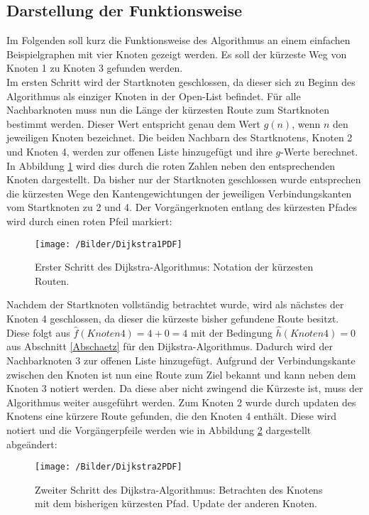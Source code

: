 	\subsection{Darstellung der Funktionsweise}
		Im Folgenden soll kurz die Funktionsweise des Algorithmus an einem einfachen Beispielgraphen mit vier Knoten gezeigt werden. Es soll der kürzeste Weg von Knoten 1 zu Knoten 3 gefunden werden.\\[4pt]
		Im ersten Schritt wird der Startknoten geschlossen, da dieser sich zu Beginn des Algorithmus als einziger Knoten in der Open-List befindet. Für alle Nachbarknoten muss nun die Länge der kürzesten Route zum Startknoten bestimmt werden. Dieser Wert entspricht genau dem Wert $g(n)$, wenn $n$ den jeweiligen Knoten bezeichnet. Die beiden Nachbarn des Startknotens, Knoten 2 und Knoten 4, werden zur offenen Liste hinzugefügt und ihre $g$-Werte berechnet. In Abbildung \ref{Dijkstra1} wird dies durch die roten Zahlen neben den entsprechenden Knoten dargestellt. Da bisher nur der Startknoten geschlossen wurde entsprechen die kürzesten Wege den Kantengewichtungen der jeweiligen Verbindungskanten vom Startknoten zu 2 und 4. Der Vorgängerknoten entlang des kürzesten Pfades wird durch einen roten Pfeil markiert:
		
		\begin{figure}[H]
			\centering
			\texttt{[image: /Bilder/Dijkstra1PDF]}
			\vspace{0.2cm}
			\caption{Erster Schritt des Dijkstra-Algorithmus: Notation der kürzesten Routen. }\label{Dijkstra1}
		\end{figure}
		
		Nachdem der Startknoten vollständig betrachtet wurde, wird als nächstes der Knoten 4 geschlossen, da dieser die kürzeste bisher gefundene Route besitzt. Diese folgt aus $\hat{f}(Knoten 4)=4+0=4$ mit der Bedingung $\hat{h}(Knoten 4) = 0$ aus Abschnitt \ref{Abschaetz} für den Dijkstra-Algorithmus. Dadurch wird der Nachbarknoten 3 zur offenen Liste hinzugefügt. Aufgrund der Verbindungskante zwischen den Knoten ist nun eine Route zum Ziel bekannt und kann neben dem Knoten 3 notiert werden. Da diese aber nicht zwingend die Kürzeste ist, muss der Algorithmus weiter ausgeführt werden. Zum Knoten 2 wurde durch updaten des Knotens eine kürzere Route gefunden, die den Knoten 4 enthält. Diese wird notiert und die Vorgängerpfeile werden wie in Abbildung \ref{Dijkstra2} dargestellt abgeändert:
		
		\begin{figure}[H]
			\centering
			\texttt{[image: /Bilder/Dijkstra2PDF]}
			\vspace{0.2cm}
			\caption{Zweiter Schritt des Dijkstra-Algorithmus: Betrachten des Knotens mit dem bisherigen kürzesten Pfad. Update der anderen Knoten.}\label{Dijkstra2}
		\end{figure}
		
